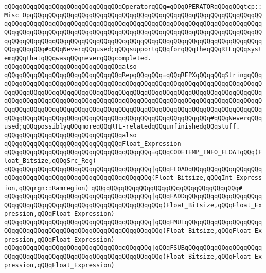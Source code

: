 \verb|qQQqqQQqqQQqqQQqqQQqqQQqqQQqqQQqOperatorqQQq=qQQqOPERATORqQQqqQQqtcp::Misc_OpqQQqqQQqqQQqqQQqqQQqqQQqqQQqqQQqqQQqqQQqqQQqqQQqqQQqqQQqqQQqqQQqqQQqqQQqqQQqqQQqqQQqqQQqqQQqqQQqqQQqqQQqqQQqqQQqqQQqqQQqqQQqqQQqqQQqqQQqqQQqqQQqqQQqqQQqqQQqqQQqqQQqqQQqqQQqqQQqqQQqqQQqqQQqqQQqqQQqqQQqqQQqqQQqqQQqqQQqqQQqqQQqqQQqqQQqqQQqqQQqqQQqqQQqqQQqqQQqqQQqqQQqqQQqqQQqqQQqqQQqqQQq#qQQqNeverqQQqused;qQQqsupportqQQqforqQQqtheqQQqRTLqQQqsystemqQQqthatqQQqwasqQQqneverqQQqcompleted.|\newline
\newline
\verb|qQQqqQQqqQQqqQQqqQQqqQQqqQQqqQQqalso|\newline
\verb|qQQqqQQqqQQqqQQqqQQqqQQqqQQqqQQqRepqQQqqQQq=qQQqREPXqQQqqQQqStringqQQqqQQqqQQqqQQqqQQqqQQqqQQqqQQqqQQqqQQqqQQqqQQqqQQqqQQqqQQqqQQqqQQqqQQqqQQqqQQqqQQqqQQqqQQqqQQqqQQqqQQqqQQqqQQqqQQqqQQqqQQqqQQqqQQqqQQqqQQqqQQqqQQqqQQqqQQqqQQqqQQqqQQqqQQqqQQqqQQqqQQqqQQqqQQqqQQqqQQqqQQqqQQqqQQqqQQqqQQqqQQqqQQqqQQqqQQqqQQqqQQqqQQqqQQqqQQqqQQqqQQqqQQqqQQqqQQqqQQqqQQqqQQqqQQqqQQqqQQqqQQqqQQqqQQqqQQqqQQqqQQqqQQqqQQqqQQqqQQq#qQQqNeverqQQqused;qQQqpossiblyqQQqmoreqQQqRTL-relatedqQQqunfinishedqQQqstuff.|\newline
\newline
\verb|qQQqqQQqqQQqqQQqqQQqqQQqqQQqqQQqalso|\newline
\verb|qQQqqQQqqQQqqQQqqQQqqQQqqQQqqQQqFloat_Expression|\newline
\verb|qQQqqQQqqQQqqQQqqQQqqQQqqQQqqQQqqQQqqQQq=qQQqCODETEMP_INFO_FLOATqQQq(Float_Bitsize,qQQqSrc_Reg)|\newline
\verb|qQQqqQQqqQQqqQQqqQQqqQQqqQQqqQQqqQQqqQQq|\verb#|qQQqFLOADqQQqqQQqqQQqqQQqqQQqqQQqqQQqqQQqqQQqqQQqqQQqqQQqqQQqqQQqqQQq(Float_Bitsize,qQQqInt_Expression,qQQqrgn::Ramregion)#\newline
\verb|qQQqqQQqqQQqqQQqqQQqqQQqqQQqqQQqqQQqqQQq#|\newline
\verb|qQQqqQQqqQQqqQQqqQQqqQQqqQQqqQQqqQQqqQQq|\verb#|qQQqFADDqQQqqQQqqQQqqQQqqQQqqQQqqQQqqQQqqQQqqQQqqQQqqQQqqQQqqQQqqQQqqQQq(Float_Bitsize,qQQqFloat_Expression,qQQqFloat_Expression)#\newline
\verb|qQQqqQQqqQQqqQQqqQQqqQQqqQQqqQQqqQQqqQQq|\verb#|qQQqFMULqQQqqQQqqQQqqQQqqQQqqQQqqQQqqQQqqQQqqQQqqQQqqQQqqQQqqQQqqQQqqQQq(Float_Bitsize,qQQqFloat_Expression,qQQqFloat_Expression)#\newline
\verb|qQQqqQQqqQQqqQQqqQQqqQQqqQQqqQQqqQQqqQQq|\verb#|qQQqFSUBqQQqqQQqqQQqqQQqqQQqqQQqqQQqqQQqqQQqqQQqqQQqqQQqqQQqqQQqqQQqqQQq(Float_Bitsize,qQQqFloat_Expression,qQQqFloat_Expression)#\newline
